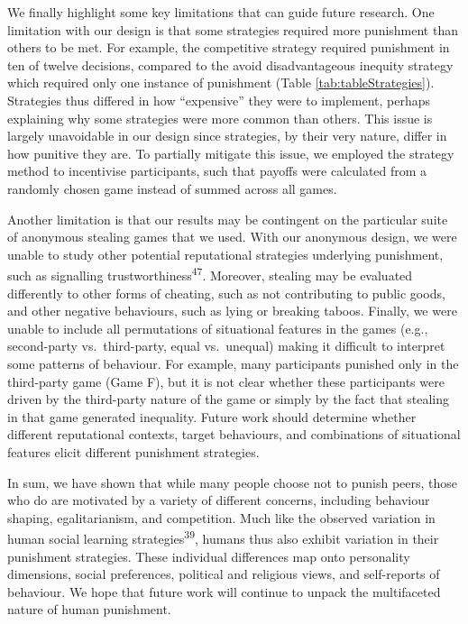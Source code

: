 \documentclass[
  man,floatsintext]{apa6}
\begin{document}
We finally highlight some key limitations that can guide future research. One
limitation with our design is that some strategies required more punishment than
others to be met. For example, the competitive strategy required punishment in
ten of twelve decisions, compared to the avoid disadvantageous inequity strategy
which required only one instance of punishment (Table \ref{tab:tableStrategies}).
Strategies thus differed in how ``expensive'' they were to implement, perhaps
explaining why some strategies were more common than others. This issue is
largely unavoidable in our design since strategies, by their very nature, differ
in how punitive they are. To partially mitigate this issue, we employed the
strategy method to incentivise participants, such that payoffs were calculated
from a randomly chosen game instead of summed across all games.

Another limitation is that our results may be contingent on the particular suite
of anonymous stealing games that we used. With our anonymous design, we were
unable to study other potential reputational strategies underlying punishment,
such as signalling trustworthiness\textsuperscript{47}. Moreover, stealing may be
evaluated differently to other forms of cheating, such as not contributing to
public goods, and other negative behaviours, such as lying or breaking taboos.
Finally, we were unable to include all permutations of situational features in
the games (e.g., second-party vs.~third-party, equal vs.~unequal) making it
difficult to interpret some patterns of behaviour. For example, many
participants punished only in the third-party game (Game F), but it is not clear
whether these participants were driven by the third-party nature of the game or
simply by the fact that stealing in that game generated inequality. Future work
should determine whether different reputational contexts, target behaviours, and
combinations of situational features elicit different punishment strategies.

In sum, we have shown that while many people choose not to punish peers, those
who do are motivated by a variety of different concerns, including behaviour
shaping, egalitarianism, and competition. Much like the observed variation in
human social learning strategies\textsuperscript{39}, humans thus also exhibit
variation in their punishment strategies. These individual differences map onto
personality dimensions, social preferences, political and religious views, and
self-reports of behaviour. We hope that future work will continue to unpack the
multifaceted nature of human punishment.
\end{document}
